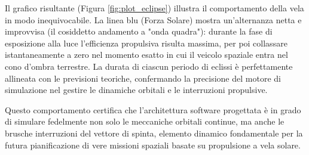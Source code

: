 Il grafico risultante (Figura \ref{fig:plot_eclipse}) illustra il comportamento della vela in modo inequivocabile. La linea blu (Forza Solare) mostra un'alternanza netta e improvvisa (il cosiddetto andamento a "onda quadra"): durante la fase di esposizione alla luce l'efficienza propulsiva risulta massima, per poi collassare istantaneamente a zero nel momento esatto in cui il veicolo spaziale entra nel cono d'ombra terrestre. La durata di ciascun periodo di eclissi è perfettamente allineata con le previsioni teoriche, confermando la precisione del motore di simulazione nel gestire le dinamiche orbitali e le interruzioni propulsive.

Questo comportamento certifica che l'architettura software progettata è in grado di simulare fedelmente non solo le meccaniche orbitali continue, ma anche le brusche interruzioni del vettore di spinta, elemento dinamico fondamentale per la futura pianificazione di vere missioni spaziali basate su propulsione a vela solare.

